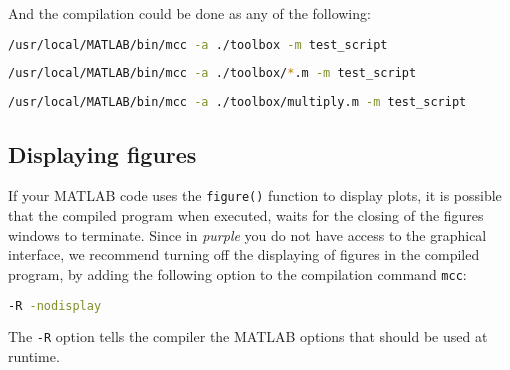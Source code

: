 And the compilation could be done as any of the following:

\begin{lstlisting}[language=bash]
/usr/local/MATLAB/bin/mcc -a ./toolbox -m test_script
\end{lstlisting}

\begin{lstlisting}[language=bash]
/usr/local/MATLAB/bin/mcc -a ./toolbox/*.m -m test_script
\end{lstlisting}

\begin{lstlisting}[language=bash]
/usr/local/MATLAB/bin/mcc -a ./toolbox/multiply.m -m test_script
\end{lstlisting}

\subsection{Displaying figures}
If your MATLAB code uses the \texttt{figure()} function to display plots, it is
possible that the compiled program when executed, waits for the closing of the
figures windows to terminate. Since in \emph{purple} you do not have access to the
graphical interface, we recommend turning off the displaying of figures in the
compiled program, by adding the following option to the compilation command
\texttt{mcc}:
\begin{lstlisting}[language=bash]
-R -nodisplay
\end{lstlisting}
The \texttt{-R} option tells the compiler the MATLAB options that should be used
at runtime.
